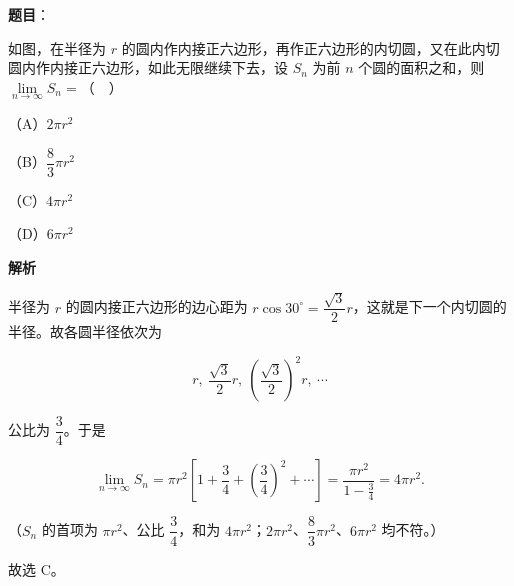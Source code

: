 \begin{answer}

\textbf{题目}：

如图，在半径为 $r$ 的圆内作内接正六边形，再作正六边形的内切圆，又在此内切圆内作内接正六边形，如此无限继续下去，设 $S_n$ 为前 $n$ 个圆的面积之和，则 $\lim\limits_{n\to\infty}S_n=$（　）

（A）$2\pi r^2$

（B）$\dfrac83\pi r^2$

（C）$4\pi r^2$

（D）$6\pi r^2$
\nopagebreak[4]
\begin{center}\end{center}
\nopagebreak[4]
\textbf{解析}

半径为 $r$ 的圆内接正六边形的边心距为 $r\cos30^\circ=\dfrac{\sqrt3}{2}r$，这就是下一个内切圆的半径。故各圆半径依次为

\nopagebreak[4]
\[r,\ \frac{\sqrt3}{2}r,\ \left(\frac{\sqrt3}{2}\right)^2r,\ \cdots\]

公比为 $\dfrac34$。于是

\nopagebreak[4]
\[\lim_{n\to\infty}S_n=\pi r^2\left[1+\frac34+\left(\frac34\right)^2+\cdots\right]
=\frac{\pi r^2}{1-\frac34}=4\pi r^2.\]

（$S_n$ 的首项为 $\pi r^2$、公比 $\dfrac34$，和为 $4\pi r^2$；$2\pi r^2$、$\dfrac83\pi r^2$、$6\pi r^2$ 均不符。）

故选 C。


\end{answer}
